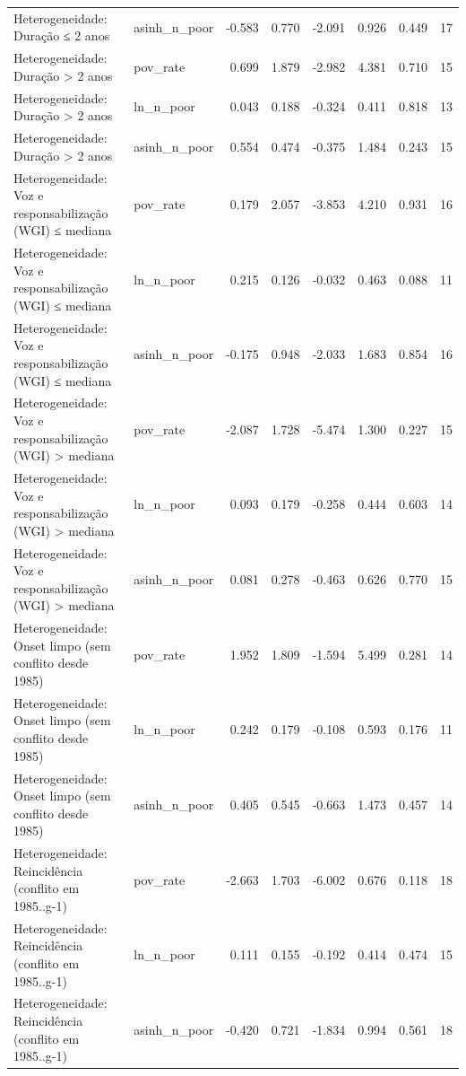 \begin{tabular}{llrrrrrr}
Heterogeneidade: Duração ≤ 2 anos & asinh_n_poor & -0.583 & 0.770 & -2.091 & 0.926 & 0.449 & 17 \\
Heterogeneidade: Duração > 2 anos & pov_rate & 0.699 & 1.879 & -2.982 & 4.381 & 0.710 & 15 \\
Heterogeneidade: Duração > 2 anos & ln_n_poor & 0.043 & 0.188 & -0.324 & 0.411 & 0.818 & 13 \\
Heterogeneidade: Duração > 2 anos & asinh_n_poor & 0.554 & 0.474 & -0.375 & 1.484 & 0.243 & 15 \\
Heterogeneidade: Voz e responsabilização (WGI) ≤ mediana & pov_rate & 0.179 & 2.057 & -3.853 & 4.210 & 0.931 & 16 \\
Heterogeneidade: Voz e responsabilização (WGI) ≤ mediana & ln_n_poor & 0.215 & 0.126 & -0.032 & 0.463 & 0.088 & 11 \\
Heterogeneidade: Voz e responsabilização (WGI) ≤ mediana & asinh_n_poor & -0.175 & 0.948 & -2.033 & 1.683 & 0.854 & 16 \\
Heterogeneidade: Voz e responsabilização (WGI) > mediana & pov_rate & -2.087 & 1.728 & -5.474 & 1.300 & 0.227 & 15 \\
Heterogeneidade: Voz e responsabilização (WGI) > mediana & ln_n_poor & 0.093 & 0.179 & -0.258 & 0.444 & 0.603 & 14 \\
Heterogeneidade: Voz e responsabilização (WGI) > mediana & asinh_n_poor & 0.081 & 0.278 & -0.463 & 0.626 & 0.770 & 15 \\
Heterogeneidade: Onset limpo (sem conflito desde 1985) & pov_rate & 1.952 & 1.809 & -1.594 & 5.499 & 0.281 & 14 \\
Heterogeneidade: Onset limpo (sem conflito desde 1985) & ln_n_poor & 0.242 & 0.179 & -0.108 & 0.593 & 0.176 & 11 \\
Heterogeneidade: Onset limpo (sem conflito desde 1985) & asinh_n_poor & 0.405 & 0.545 & -0.663 & 1.473 & 0.457 & 14 \\
Heterogeneidade: Reincidência (conflito em 1985..g-1) & pov_rate & -2.663 & 1.703 & -6.002 & 0.676 & 0.118 & 18 \\
Heterogeneidade: Reincidência (conflito em 1985..g-1) & ln_n_poor & 0.111 & 0.155 & -0.192 & 0.414 & 0.474 & 15 \\
Heterogeneidade: Reincidência (conflito em 1985..g-1) & asinh_n_poor & -0.420 & 0.721 & -1.834 & 0.994 & 0.561 & 18 \\
\bottomrule
\end{tabular}
